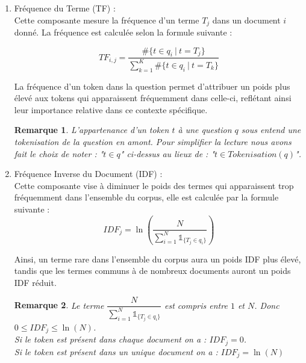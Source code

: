 \documentclass[12pt]{article}
\newtheorem{rmq}{Remarque}
\theoremstyle{definition}
\begin{document}
	\begin{enumerate}
		\item Fréquence du Terme (TF) :\\
		
		Cette composante mesure la fréquence d'un terme $T_j$ dans un document $i$ donné. La fréquence est calculée selon la formule suivante : 
		
		$$  TF_{i,j} = \dfrac{\#\{t\in q_i ~|~ t = T_j\}}{\displaystyle\sum_{k=1}^{K}\#\{t\in q_i ~|~ t = T_k\}}$$
		
		

		La fréquence d'un token dans la question permet d'attribuer un poids plus élevé aux tokens qui apparaissent fréquemment dans celle-ci, reflétant ainsi leur importance relative dans ce contexte spécifique.\\
		
		\begin{rmq}
		L'appartenance d'un token $t$ à une question $q$ sous entend une tokenisation de la question en amont. Pour simplifier la lecture nous avons fait le choix de noter : "$t\in q$" ci-dessus au lieux de : "$t\in Tokenisation(q)$". \\ 
		\end{rmq}
		
		
		\item Fréquence Inverse du Document (IDF) : \\
		
		Cette composante vise à diminuer le poids des termes qui apparaissent trop fréquemment dans l'ensemble du corpus, elle est calculée par la formule suivante :
		$$  IDF_{j} = \ln\left(\dfrac{N}{\sum_{i=1}^{N}\mathbb{1}_{\{T_j \in q_i\}}}\right)$$ 
		
		Ainsi, un terme rare dans l'ensemble du corpus aura un poids IDF plus élevé, tandis que les termes communs à de nombreux documents auront un poids IDF réduit.\\

		\begin{rmq}
			Le terme $\dfrac{N}{\sum_{i=1}^{N}\mathbb{1}_{\{T_j \in q_i\}}}$ est compris entre $1$ et $N$. Donc $0\leq IDF_{j} \leq \ln(N)$.\\
			
			Si le token est présent dans chaque document on a : $IDF_{j} = 0$.\\
			Si le token est présent dans un unique document on a : $IDF_{j} = \ln(N)$  
		\end{rmq}
		
	\end{enumerate}
	
\end{document}
